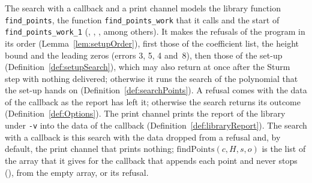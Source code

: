 \begin{definition}\label{def:findPoints}
  \leanok
  The search with a callback and a print channel models the library function \verb|find_points|, the
  function \verb|find_points_work| that it calls and the start of \verb|find_points_work_1|
  (, ,
  , among others). It makes the refusals of the program in its
  order (Lemma~\ref{lem:setupOrder}), first those of the coefficient list, the height bound and the
  leading zeros (errors 3, 5, 4 and~8), then those of the set-up (Definition~\ref{def:setupSearch}),
  which may also return at once after the Sturm step with nothing delivered; otherwise it runs the
  search of the polynomial that the set-up hands on (Definition~\ref{def:searchPoints}). A refusal
  comes with the data of the callback as the report has left it; otherwise the search returns its
  outcome (Definition~\ref{def:Options}). The print channel prints the report of the library under
  \verb|-v| into the data of the callback (Definition~\ref{def:libraryReport}). The search with a
  callback is this search with the data dropped from a refusal and, by default, the print channel
  that prints nothing; $\mathrm{findPoints}(c, H, s, o)$ is the list of the array that it gives for
  the callback that appends each point and never stops (), from the
  empty array, or its refusal.
\end{definition}

